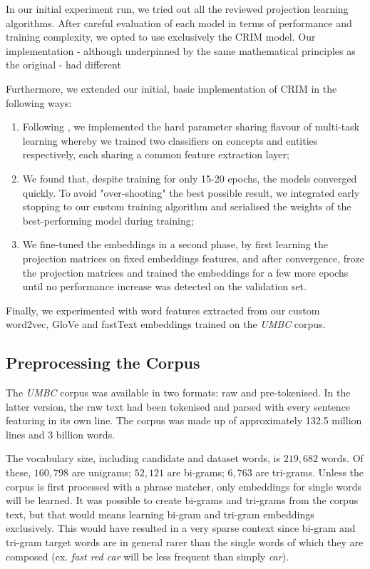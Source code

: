 In our initial experiment run, we tried out all the reviewed projection learning algorithms.  After careful evaluation of each model in terms of performance and training complexity, we opted to use exclusively the CRIM model.  Our implementation - although underpinned by the same mathematical principles as the original - had different 

Furthermore, we extended our initial, basic implementation of CRIM in the following ways:
\begin{enumerate}
    \item Following \citep{bernier2018crim}, we implemented the hard parameter sharing flavour of multi-task learning \citep{ruder2017overview} whereby we trained two classifiers on concepts and entities respectively, each sharing a common feature extraction layer;
    \item We found that, despite training for only 15-20 epochs, the models converged quickly. To avoid "over-shooting" the best possible result, we integrated early stopping to our custom training algorithm and serialised the weights of the best-performing model during training;
    \item We fine-tuned the embeddings in a second phase, by first learning the projection matrices on fixed embeddings features, and after convergence, froze the projection matrices and trained the embeddings for a few more epochs until no performance increase was detected on the validation set.
\end{enumerate}

Finally, we experimented with word features extracted from our custom word2vec, GloVe and fastText embeddings trained on the \textit{UMBC} corpus.  

\subsection{Preprocessing the Corpus} \label{semeval_preprocessing}
The \textit{UMBC} corpus was available in two formats: raw and pre-tokenised.  In the latter version, the raw text had been tokenised and parsed with every sentence featuring in its own line.  The corpus was made up of approximately 132.5 million lines and 3 billion words. 

The vocabulary size, including candidate and dataset words, is $219,682$ words.  Of these, $160,798$ are unigrams; $52,121$ are bi-grams; $6,763$ are tri-grams.  Unless the corpus is first processed with a phrase matcher, only embeddings for single words will be learned.  It was possible to create bi-grams and tri-grams from the corpus text, but that would means learning bi-gram and tri-gram embeddings exclusively.  This would have resulted in a very sparse context since bi-gram and tri-gram target words are in general rarer than the single words of which they are composed (ex. \textit{fast red car} will be less frequent than simply \textit{car}).  

